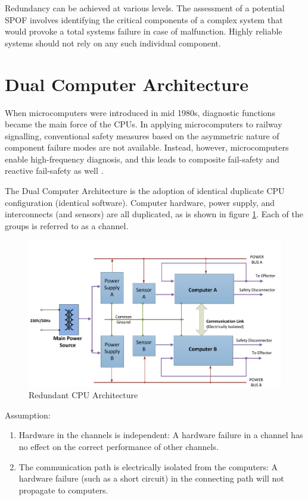 \documentclass[journal]{IEEEtran}
\begin{document}
    Redundancy can be achieved at various levels. The assessment of a potential SPOF involves 
    identifying the critical components of a complex system that would provoke a total systems 
    failure in case of malfunction. Highly reliable systems should not rely on any such individual 
    component.

\section{Dual Computer Architecture}
  
  When microcomputers were introduced in mid 1980s, diagnostic functions became the main force of 
  the CPUs. In applying microcomputers to railway signalling, conventional safety measures based on 
  the asymmetric nature of component failure modes are not available. Instead, however, 
  microcomputers enable high-frequency diagnosis, and this leads to composite fail-safety and 
  reactive fail-safety as well \cite{Rastocny2013}. 
  
  The Dual Computer Architecture is the adoption of identical duplicate CPU configuration 
  (identical software).  Computer hardware, power supply, and interconnects (and
  sensors) are all duplicated, as is shown in figure \ref{HW002:fig005}. Each of the groups is 
  referred to as a channel.
  

  \begin{figure}[!ht] %
    \centering
    \includegraphics[width=1\linewidth]{fig_HW005.pdf}
    \caption{Redundant CPU Architecture }
    \label{HW002:fig005}
  \end{figure}

  Assumption:
  \begin{enumerate}
    \item Hardware in the channels is independent: A hardware failure in a channel has no effect 
          on the correct performance of other channels.
    \item The communication path is electrically isolated from the computers: A hardware failure 
          (such as a short circuit) in the connecting path will not propagate to computers.
   \end{enumerate}
   
\end{document}
